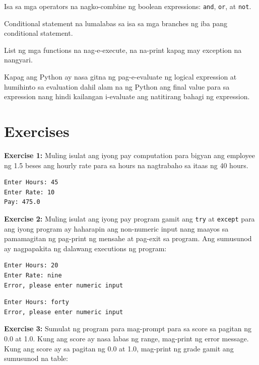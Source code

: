 \documentclass[10pt,]{book}
\begin{document}
\begin{description}
Isa sa mga operators na nagko-combine ng boolean expressions:
\texttt{and}, \texttt{or}, at \texttt{not}.
\item[nested conditional]
Conditional statement na lumalabas sa isa sa mga branches ng iba pang
conditional statement. 
\item[traceback]
List ng mga functions na nag-e-execute, na na-print kapag may exception
na nangyari. 
\item[short circuit]
Kapag ang Python ay nasa gitna ng pag-e-evaluate ng logical expression
at humihinto sa evaluation dahil alam na ng Python ang final value para
sa expression nang hindi kailangan i-evaluate ang natitirang bahagi ng
expression. 
\end{description}

\section{Exercises}\label{exercises-2}

\textbf{Exercise 1:} Muling isulat ang iyong pay computation para bigyan
ang employee ng 1.5 beses ang hourly rate para sa hours na nagtrabaho sa
itaas ng 40 hours.

{\small
\begin{verbatim}
Enter Hours: 45
Enter Rate: 10
Pay: 475.0
\end{verbatim}
}

\textbf{Exercise 2:} Muling isulat ang iyong pay program gamit ang
\texttt{try} at \texttt{except} para ang iyong program ay haharapin ang
non-numeric input nang maayos sa pamamagitan ng pag-print ng mensahe at
pag-exit sa program. Ang sumusunod ay nagpapakita ng dalawang executions
ng program:

{\small
\begin{verbatim}
Enter Hours: 20
Enter Rate: nine
Error, please enter numeric input
\end{verbatim}
}

{\small
\begin{verbatim}
Enter Hours: forty
Error, please enter numeric input
\end{verbatim}
}

\textbf{Exercise 3:} Sumulat ng program para mag-prompt para sa score sa
pagitan ng 0.0 at 1.0. Kung ang score ay nasa labas ng range, mag-print
ng error message. Kung ang score ay sa pagitan ng 0.0 at 1.0, mag-print
ng grade gamit ang sumusunod na table:
\end{document}
